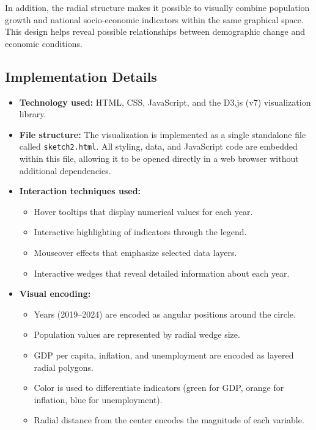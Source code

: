 \documentclass[11pt,a4paper]{article}
\begin{document}
In addition, the radial structure makes it possible to visually combine population growth and national socio-economic indicators within the same graphical space. This design helps reveal possible relationships between demographic change and economic conditions.

\subsection{Implementation Details}

\begin{itemize}[leftmargin=1.5em]
    \item \textbf{Technology used:} HTML, CSS, JavaScript, and the D3.js (v7) visualization library.
    
    \item \textbf{File structure:} The visualization is implemented as a single standalone file called \texttt{sketch2.html}. All styling, data, and JavaScript code are embedded within this file, allowing it to be opened directly in a web browser without additional dependencies.
    
    \item \textbf{Interaction techniques used:}
    \begin{itemize}
        \item Hover tooltips that display numerical values for each year.
        \item Interactive highlighting of indicators through the legend.
        \item Mouseover effects that emphasize selected data layers.
        \item Interactive wedges that reveal detailed information about each year.
    \end{itemize}
    
    \item \textbf{Visual encoding:}
    \begin{itemize}
        \item Years (2019–2024) are encoded as angular positions around the circle.
        \item Population values are represented by radial wedge size.
        \item GDP per capita, inflation, and unemployment are encoded as layered radial polygons.
        \item Color is used to differentiate indicators (green for GDP, orange for inflation, blue for unemployment).
        \item Radial distance from the center encodes the magnitude of each variable.
    \end{itemize}
\end{itemize}
\end{document}
